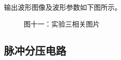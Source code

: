 \documentclass[a4paper]{article}
\begin{document}
    {{输出波形图像及波形参数如下图所示。}}

    \begin{figure}[htb]
        \centering
        \centering
        \caption{\small 图十一：实验三相关图片}
    \end{figure}

    \subsection{脉冲分压电路}\label{subsec:2}
\end{document}
